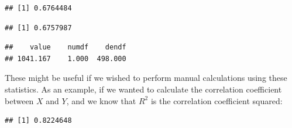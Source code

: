 \documentclass[]{book}
\newenvironment{Shaded}{\begin{snugshade}}{\end{snugshade}}
\newcommand{\KeywordTok}[1]{\textcolor[rgb]{0.13,0.29,0.53}{\textbf{#1}}}
\newcommand{\CommentTok}[1]{\textcolor[rgb]{0.56,0.35,0.01}{\textit{#1}}}
\newcommand{\OperatorTok}[1]{\textcolor[rgb]{0.81,0.36,0.00}{\textbf{#1}}}
\newcommand{\NormalTok}[1]{#1}
\theoremstyle{definition}
\theoremstyle{definition}
\theoremstyle{definition}
\theoremstyle{remark}
\begin{document}
\begin{verbatim}
## [1] 0.6764484
\end{verbatim}

\begin{Shaded}
\end{Shaded}

\begin{verbatim}
## [1] 0.6757987
\end{verbatim}

\begin{Shaded}
\end{Shaded}

\begin{verbatim}
##    value    numdf    dendf 
## 1041.167    1.000  498.000
\end{verbatim}

These might be useful if we wished to perform manual calculations using
these statistics. As an example, if we wanted to calculate the
correlation coefficient between \(X\) and \(Y\), and we know that
\(R^2\) is the correlation coefficient squared:

\begin{Shaded}
\end{Shaded}

\begin{verbatim}
## [1] 0.8224648
\end{verbatim}

\begin{Shaded}
\end{Shaded}
\end{document}
